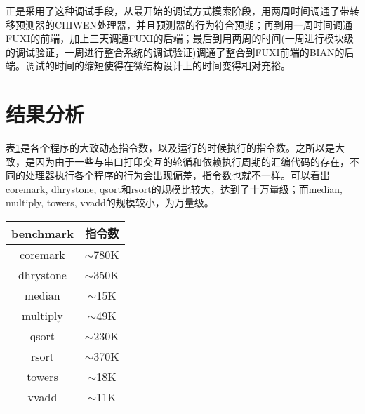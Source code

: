 正是采用了这种调试手段，从最开始的调试方式摸索阶段，用两周时间调通了带转移预测器的CHIWEN处理器，并且预测器的行为符合预期；再到用一周时间调通FUXI的前端，加上三天调通FUXI的后端；最后到用两周的时间(一周进行模块级的调试验证，一周进行整合系统的调试验证)调通了整合到FUXI前端的BIAN的后端。调试的时间的缩短使得在微结构设计上的时间变得相对充裕。

\section{结果分析}
表\ref{tab:inst_number}是各个程序的大致动态指令数，以及运行的时候执行的指令数。之所以是大致，是因为由于一些与串口打印交互的轮循和依赖执行周期的汇编代码的存在，不同的处理器执行各个程序的行为会出现偏差，指令数也就不一样。可以看出coremark, dhrystone, qsort和rsort的规模比较大，达到了十万量级；而median, multiply, towers, vvadd的规模较小，为万量级。
\begin{table}[!htbp]
	\label{tab:inst_number}
	\centering
	\footnotesize%
	\setlength{\tabcolsep}{4pt}%
	\renewcommand{\arraystretch}{1.2}%
	\begin{tabular}{cc}
		\hline
		benchmark & 指令数 \\%
		\hline
		coremark    & $ \sim $780K\\
		dhrystone   & $ \sim $350K\\
		median 		& $ \sim $15K\\
		multiply 	& $ \sim $49K\\
		qsort  		& $ \sim $230K\\
		rsort  		& $ \sim $370K\\
		towers 		& $ \sim $18K\\
		vvadd 		& $ \sim $11K\\
		\hline
	\end{tabular}
\end{table}

